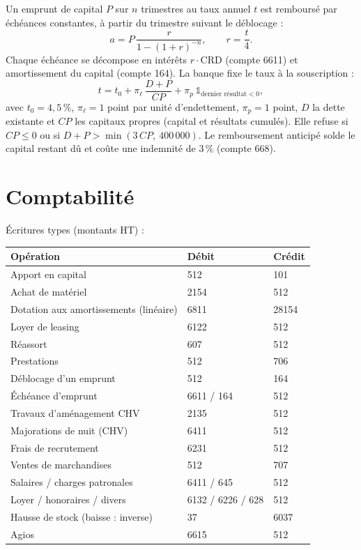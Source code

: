 \documentclass[11pt,a4paper]{article}
\begin{document}
Un emprunt de capital $P$ sur $n$ trimestres au taux annuel $t$ est
remboursé par échéances constantes, à partir du trimestre suivant le
déblocage :
\[
  a = P\,\frac{r}{1-(1+r)^{-n}}, \qquad r = \frac{t}{4}.
\]
Chaque échéance se décompose en intérêts $r \cdot \mathrm{CRD}$ (compte
6611) et amortissement du capital (compte 164). La banque fixe le taux à
la souscription :
\[
  t = t_0 + \pi_\ell\,\frac{D + P}{\mathit{CP}} + \pi_p\,\mathbb{1}_{\text{dernier résultat} < 0},
\]
avec $t_0 = 4{,}5\,\%$, $\pi_\ell = 1$ point par unité d'endettement,
$\pi_p = 1$ point, $D$ la dette existante et $\mathit{CP}$ les capitaux
propres (capital et résultats cumulés). Elle refuse si $\mathit{CP} \le 0$
ou si $D + P > \min(3\,\mathit{CP},\ 400\,000)$. Le remboursement anticipé
solde le capital restant dû et coûte une indemnité de 3\,\% (compte 668).

\section{Comptabilité}

Écritures types (montants HT) :

\begin{center}
\begin{tabular}{@{}lll@{}}
\toprule
Opération & Débit & Crédit \\
\midrule
Apport en capital & 512 & 101 \\
Achat de matériel & 2154 & 512 \\
Dotation aux amortissements (linéaire) & 6811 & 28154 \\
Loyer de leasing & 6122 & 512 \\
Réassort & 607 & 512 \\
Prestations & 512 & 706 \\
Déblocage d'un emprunt & 512 & 164 \\
Échéance d'emprunt & 6611 / 164 & 512 \\
Travaux d'aménagement CHV & 2135 & 512 \\
Majorations de nuit (CHV) & 6411 & 512 \\
Frais de recrutement & 6231 & 512 \\
Ventes de marchandises & 512 & 707 \\
Salaires / charges patronales & 6411 / 645 & 512 \\
Loyer / honoraires / divers & 6132 / 6226 / 628 & 512 \\
Hausse de stock (baisse : inverse) & 37 & 6037 \\
Agios & 6615 & 512 \\
\bottomrule
\end{tabular}
\end{center}
\end{document}
